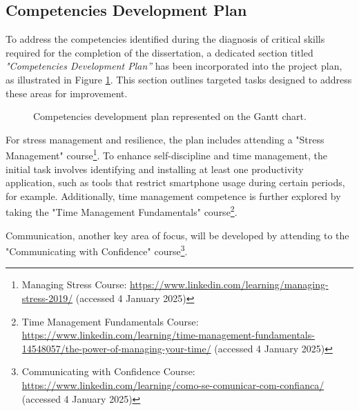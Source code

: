 \subsection{Competencies Development Plan}

To address the competencies identified during the diagnosis of critical skills required for the completion of the dissertation, a dedicated section titled \textit{"Competencies Development Plan”} has been incorporated into the project plan, as illustrated in Figure \ref{fig:gantt_competency}. This section outlines targeted tasks designed to address these areas for improvement.

\begin{figure}
      \centering
      \caption{Competencies development plan represented on the Gantt chart.}
      \label{fig:gantt_competency}
\end{figure}

For stress management and resilience, the plan includes attending a "Stress Management" course\footnote{Managing Stress Course: \url{https://www.linkedin.com/learning/managing-stress-2019/} (accessed 4 January 2025)}. To enhance self-discipline and time management, the initial task involves identifying and installing at least one productivity application, such as tools that restrict smartphone usage during certain periods, for example. Additionally, time management competence is further explored by taking the "Time Management Fundamentals" course\footnote{Time Management Fundamentals Course: \url{https://www.linkedin.com/learning/time-management-fundamentals-14548057/the-power-of-managing-your-time/} (accessed 4 January 2025)}.

Communication, another key area of focus, will be developed by attending to the "Communicating with Confidence" course\footnote{Communicating with Confidence Course: \url{https://www.linkedin.com/learning/como-se-comunicar-com-confianca/} (accessed 4 January 2025)}.

